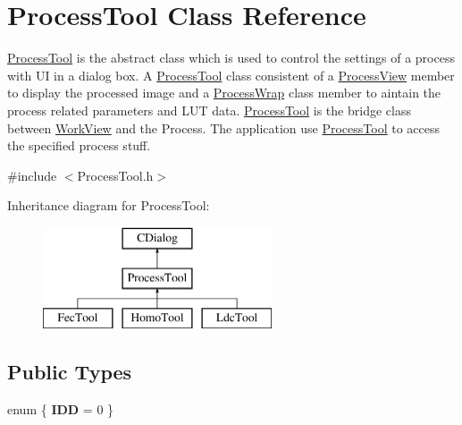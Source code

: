 \hypertarget{class_process_tool}{}\section{Process\+Tool Class Reference}
\label{class_process_tool}


\mbox{\hyperlink{class_process_tool}{Process\+Tool}} is the abstract class which is used to control the settings of a process with UI in a dialog box. A \mbox{\hyperlink{class_process_tool}{Process\+Tool}} class consistent of a \mbox{\hyperlink{class_process_view}{Process\+View}} member to display the processed image and a \mbox{\hyperlink{class_process_wrap}{Process\+Wrap}} class member to aintain the process related parameters and L\+UT data. \mbox{\hyperlink{class_process_tool}{Process\+Tool}} is the bridge class between \mbox{\hyperlink{class_work_view}{Work\+View}} and the Process. The application use \mbox{\hyperlink{class_process_tool}{Process\+Tool}} to access the specified process stuff.  




{\ttfamily \#include $<$Process\+Tool.\+h$>$}

Inheritance diagram for Process\+Tool\+:\begin{figure}[H]
\begin{center}
\leavevmode
\includegraphics[height=3.000000cm]{class_process_tool}
\end{center}
\end{figure}
\subsection*{Public Types}
\begin{DoxyCompactItemize}
\item 
\mbox{\label{class_process_tool_a476140737a8e6c273f9297bd384f8cae}} 
enum \{ {\bfseries I\+DD} = 0
 \}
\end{DoxyCompactItemize}
